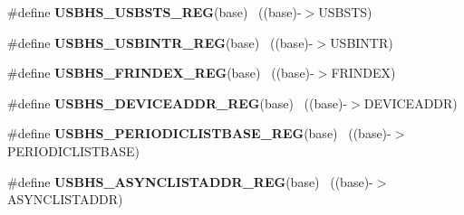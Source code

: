 \begin{DoxyCompactItemize}
\item 
\hypertarget{group___u_s_b_h_s___register___accessor___macros_ga1d831cba78605660d828293c95830e85}{}\#define {\bfseries U\+S\+B\+H\+S\+\_\+\+U\+S\+B\+S\+T\+S\+\_\+\+R\+E\+G}(base)                                  ~((base)-\/$>$U\+S\+B\+S\+T\+S)\label{group___u_s_b_h_s___register___accessor___macros_ga1d831cba78605660d828293c95830e85}

\item 
\hypertarget{group___u_s_b_h_s___register___accessor___macros_gafbb2afa4fa15958e7efdcd44a9cd5975}{}\#define {\bfseries U\+S\+B\+H\+S\+\_\+\+U\+S\+B\+I\+N\+T\+R\+\_\+\+R\+E\+G}(base)                                ~((base)-\/$>$U\+S\+B\+I\+N\+T\+R)\label{group___u_s_b_h_s___register___accessor___macros_gafbb2afa4fa15958e7efdcd44a9cd5975}

\item 
\hypertarget{group___u_s_b_h_s___register___accessor___macros_ga33f6adce46536751d265d4d1b9f6e1d6}{}\#define {\bfseries U\+S\+B\+H\+S\+\_\+\+F\+R\+I\+N\+D\+E\+X\+\_\+\+R\+E\+G}(base)                                ~((base)-\/$>$F\+R\+I\+N\+D\+E\+X)\label{group___u_s_b_h_s___register___accessor___macros_ga33f6adce46536751d265d4d1b9f6e1d6}

\item 
\hypertarget{group___u_s_b_h_s___register___accessor___macros_ga1c3a2ae91df820822b48aabfd87cf38c}{}\#define {\bfseries U\+S\+B\+H\+S\+\_\+\+D\+E\+V\+I\+C\+E\+A\+D\+D\+R\+\_\+\+R\+E\+G}(base)                          ~((base)-\/$>$D\+E\+V\+I\+C\+E\+A\+D\+D\+R)\label{group___u_s_b_h_s___register___accessor___macros_ga1c3a2ae91df820822b48aabfd87cf38c}

\item 
\hypertarget{group___u_s_b_h_s___register___accessor___macros_ga84f5427449bc9c49d81393cda595c08b}{}\#define {\bfseries U\+S\+B\+H\+S\+\_\+\+P\+E\+R\+I\+O\+D\+I\+C\+L\+I\+S\+T\+B\+A\+S\+E\+\_\+\+R\+E\+G}(base)              ~((base)-\/$>$P\+E\+R\+I\+O\+D\+I\+C\+L\+I\+S\+T\+B\+A\+S\+E)\label{group___u_s_b_h_s___register___accessor___macros_ga84f5427449bc9c49d81393cda595c08b}

\item 
\hypertarget{group___u_s_b_h_s___register___accessor___macros_gac6c9b8c16bbebb19e78c35eafb894cdb}{}\#define {\bfseries U\+S\+B\+H\+S\+\_\+\+A\+S\+Y\+N\+C\+L\+I\+S\+T\+A\+D\+D\+R\+\_\+\+R\+E\+G}(base)                    ~((base)-\/$>$A\+S\+Y\+N\+C\+L\+I\+S\+T\+A\+D\+D\+R)\label{group___u_s_b_h_s___register___accessor___macros_gac6c9b8c16bbebb19e78c35eafb894cdb}


\end{DoxyCompactItemize}
